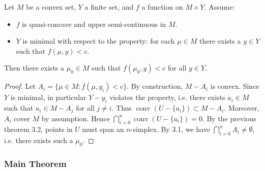 \begin{thm}
    Let $M$ be a convex set, $Y$ a finite set, and $f$ a function on $M \times Y$. Assume:
    \begin{itemize}
        \item $f$ is quasi-concave and upper semi-continuous in $M$.
        \item $Y$ is minimal with respect to the property: for each $\mu \in M$ there exists a $y \in Y$ such that $f(\mu, y) < c$.
    \end{itemize}
    Then there exists a $\mu_0 \in M$ such that $f(\mu_0, y) < c$ for all $y \in Y$.
\end{thm}
\begin{proof}
    Let $A_i = \{ \mu \in M : f(\mu, y_i) < c \}$. By construction, $M - A_i$ is convex. Since $Y$ is minimal, in particular $Y - y_i$ violates the property, i.e. there exists $a_i \in M$ such that $a_i \in M - A_j$ for all $j \neq i$. Thus $\operatorname{conv}(U - \{a_i\}) \subset M - A_i$. Moreover, $A_i$ cover $M$ by assumption. Hence $\bigcap_{i=0}^n \operatorname{conv}(U - \{a_i\}) = 0$. By the previous theorem 3.2, points in $U$ must span an $n$-simplex. By 3.1, we have $\bigcap_{i=0}^n A_i \neq \emptyset$, i.e. there exists such a $\mu_0$.
\end{proof}

\subsubsection{Main Theorem}

